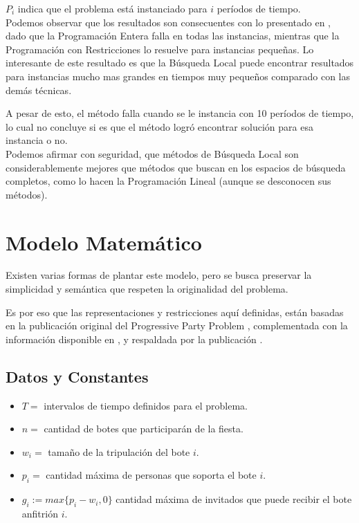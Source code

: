 \documentclass[letter, 10pt]{article}
\begin{document}
$P_i$ indica que el problema está instanciado para $i$ períodos de tiempo.\\

Podemos observar que los resultados son consecuentes con lo presentado en \cite{FirstPublication}, dado que la Programación Entera falla en todas las instancias, mientras que la Programación con Restricciones lo resuelve para instancias pequeñas. Lo interesante de este resultado es que la Búsqueda Local puede encontrar resultados para instancias mucho mas grandes en tiempos muy pequeños comparado con las demás técnicas.

A pesar de esto, el método falla cuando se le instancia con 10 períodos de tiempo, lo cual no concluye si es que el método logró encontrar solución para esa instancia o no.\\

Podemos afirmar con seguridad, que métodos de Búsqueda Local son considerablemente mejores que métodos que buscan en los espacios de búsqueda completos, como lo hacen la Programación Lineal (aunque se desconocen sus métodos).

\section{Modelo Matemático}
Existen varias formas de plantar este modelo, pero se busca preservar la simplicidad y semántica que respeten la originalidad del problema.

Es por eso que las representaciones y restricciones aquí definidas, están basadas en la publicación original del Progressive Party Problem \cite{FirstPublication}, complementada con la información disponible en \cite{CustomizingSearch}, y respaldada por la publicación \cite{PPPAsMIP}.\\



\subsection{Datos y Constantes}
\begin{itemize}
\item $T =$ intervalos de tiempo definidos para el problema.
\item $n =$ cantidad de botes que participarán de la fiesta.
\item $w_i =$ tamaño de la tripulación del bote $i$.
\item $p_i =$ cantidad máxima de personas que soporta el bote $i$.
\item $g_i := max\{p_i-w_i,0\}$ cantidad máxima de invitados que puede recibir el bote anfitrión $i$.
\end{itemize}
\end{document}
